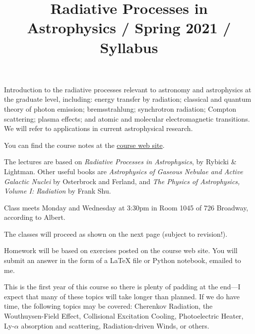 \documentclass[11pt, preprint]{aastex}
\begin{document}
\title{\bf Radiative Processes in Astrophysics / Spring 2021 / Syllabus }

\noindent Introduction to the radiative processes relevant to astronomy and
astrophysics at the graduate level, including: energy transfer by
radiation; classical and quantum theory of photon emission;
bremsstrahlung; synchrotron radiation; Compton scattering; plasma
effects; and atomic and molecular electromagnetic transitions.  We
will refer to applications in current astrophysical research.

\noindent You can find the course notes at the
\href{http://blanton144.github.io/radiative}{course web site}. 

\noindent The lectures are based on {\it Radiative Processes in
  Astrophysics}, by Rybicki \& Lightman. Other useful books are {\it
  Astrophysics of Gaseous Nebulae and Active Galactic Nuclei} by
Osterbrock and Ferland, and {\it The Physics of Astrophysics, Volume
  I: Radiation} by Frank Shu. 

\noindent Class meets Monday and Wednesday at 3:30pm in Room 1045 of
726 Broadway, according to Albert.

\noindent The classes will proceed as shown on the next page (subject
to revision!).

\noindent 
Homework will be based on exercises posted on the course web site.
You will submit an answer in the form of a LaTeX file or Python
notebook, emailed to me.

\noindent 
This is the first year of this course so there is plenty of padding at
the end---I expect that many of these topics will take longer than
planned. If we do have time, the following topics may be covered:
Cherenkov Radiation, the Wouthuysen-Field Effect, Collisional
Excitation Cooling, Photoelectric Heater, Ly-$\alpha$ absorption and
scattering, Radiation-driven Winds, or others.
\end{document}
